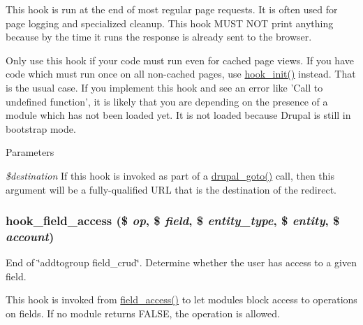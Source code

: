 This hook is run at the end of most regular page requests. It is often used for page logging and specialized cleanup. This hook MUST NOT print anything because by the time it runs the response is already sent to the browser.

Only use this hook if your code must run even for cached page views. If you have code which must run once on all non-\/cached pages, use \hyperlink{group__hooks_ga74edef0c463436fdbb1f92ef367db051}{hook\_\-init()} instead. That is the usual case. If you implement this hook and see an error like 'Call to undefined function', it is likely that you are depending on the presence of a module which has not been loaded yet. It is not loaded because Drupal is still in bootstrap mode.


\begin{DoxyParams}{Parameters}
\item[{\em \$destination}]If this hook is invoked as part of a \hyperlink{group__http__handling_ga5b68d7a934713d1d623b2b32a732235d}{drupal\_\-goto()} call, then this argument will be a fully-\/qualified URL that is the destination of the redirect. \end{DoxyParams}
\hypertarget{group__hooks_ga9281312bdad448a24f3cfb7e341b36ba}{
\subsubsection[{hook\_\-field\_\-access}]{\setlength{\rightskip}{0pt plus 5cm}hook\_\-field\_\-access (\$ {\em op}, \/  \$ {\em field}, \/  \$ {\em entity\_\-type}, \/  \$ {\em entity}, \/  \$ {\em account})}}
\label{group__hooks_ga9281312bdad448a24f3cfb7e341b36ba}
End of \char`\"{}addtogroup field\_\-crud\char`\"{}. Determine whether the user has access to a given field.

This hook is invoked from \hyperlink{group__field_gad363d4b50f9326e85cbf1180cd848b3b}{field\_\-access()} to let modules block access to operations on fields. If no module returns FALSE, the operation is allowed.


